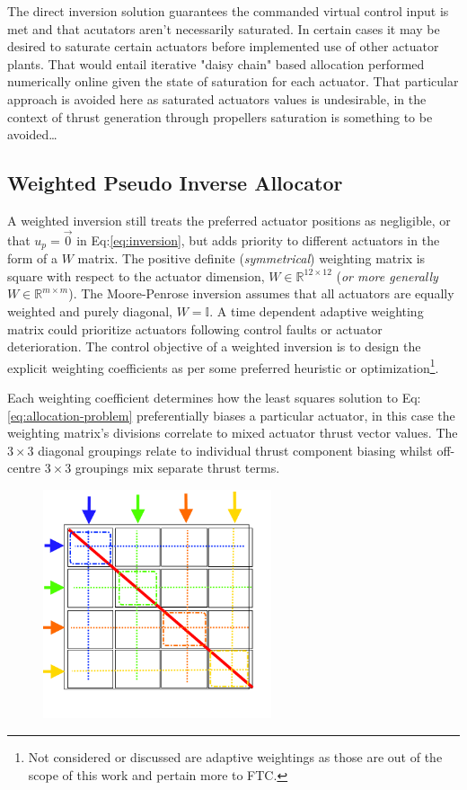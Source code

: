 {\par
The direct inversion solution guarantees the commanded virtual control input is met and that acutators aren't necessarily saturated. In certain cases it may be desired to saturate certain actuators before implemented use of other actuator plants. That would entail iterative "daisy chain"\cite{} based allocation performed numerically online given the state of saturation for each actuator. That particular approach is avoided here as saturated actuators values is undesirable, in the context of thrust generation through propellers saturation is something to be avoided\ldots
\subsection{Weighted Pseudo Inverse Allocator}
\label{subsec:control.allocation.weightedinverse}
A weighted inversion still treats the preferred actuator positions as negligible, or that $u_p=\vec{0}$ in Eq:\ref{eq:inversion}, but adds priority to different actuators in the form of a $W$ matrix. The positive definite (\emph{symmetrical}) weighting matrix is square with respect to the actuator dimension, $W\in\mathbb{R}^{12\times 12}$ (\emph{or more generally $W\in\mathbb{R}^{m\times m}$}). The Moore-Penrose inversion assumes that all actuators are equally weighted and purely diagonal, $W=\mathbb{I}$. A time dependent adaptive weighting matrix could prioritize actuators following control faults or actuator deterioration. The control objective of a weighted inversion is to design the explicit weighting coefficients as per some preferred heuristic or optimization\footnote{Not considered or discussed are adaptive weightings as those are out of the scope of this work and pertain more to FTC\cite{}.}.
\par
Each weighting coefficient determines how the least squares solution to Eq:\ref{eq:allocation-problem} preferentially biases a particular actuator, in this case the weighting matrix's divisions correlate to mixed actuator thrust vector values. The $3\times 3$ diagonal groupings relate to individual thrust component biasing whilst off-centre $3\times 3$ groupings mix separate thrust terms. 
\begin{figure}[htbp]
\centering
\includegraphics[width=0.6\textwidth]{figs/weighted-matrix}

\end{figure}}
